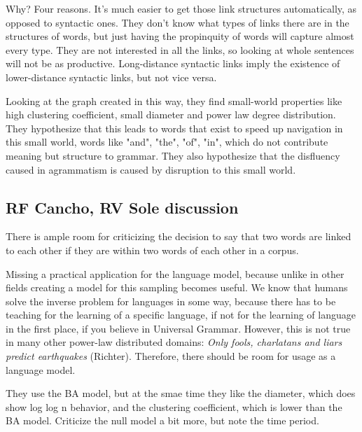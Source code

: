 \documentclass[12pt]{article}
\begin{document}
Why? Four reasons. It's much easier to get those link structures automatically, as opposed to syntactic ones. They don't know what types of links there are in the structures of words, but just having the propinquity of words will capture almost every type. They are not interested in all the links, so looking at whole sentences will not be as productive. Long-distance syntactic links imply the existence of lower-distance syntactic links, but not vice versa. %

Looking at the graph created in this way, they find small-world properties like high clustering coefficient, small diameter and power law degree distribution. They hypothesize that this leads to words that exist to speed up navigation in this small world, words like "and", "the", "of", "in", which do not contribute meaning but structure to grammar. They also hypothesize that the disfluency caused in agrammatism is caused by disruption to this small world.

\subsection{RF Cancho, RV Sole discussion}

There is ample room for criticizing the decision to say that two words are linked to each other if they are within two words of each other in a corpus. %

Missing a practical application for the language model, because unlike in other fields creating a model for this sampling becomes useful. We know that humans solve the inverse problem for languages in some way, because there has to be teaching for the learning of a specific language, if not for the learning of language in the first place, if you believe in Universal Grammar. However, this is not true in many other power-law distributed domains: \emph{Only fools, charlatans and liars predict earthquakes} (Richter). Therefore, there should be room for usage as a language model. %

They use the BA model, but at the smae time they like the diameter, which does show log log n behavior, and the clustering coefficient, which is lower than the BA model. Criticize the null model a bit more, but note the time period.
\end{document}
